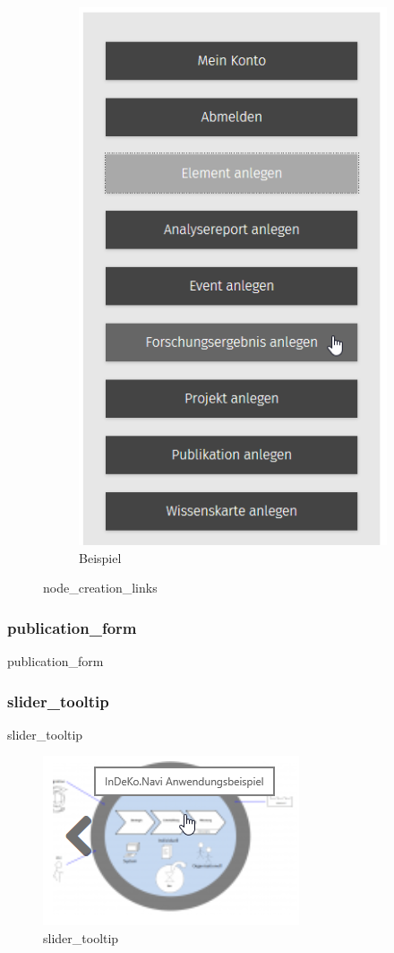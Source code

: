 \begin{figure}[H]
\begin{subfigure}[A]{0.4\textwidth}
		\includegraphics[height=0.20\textheight]{images/example_nodecreationlinks}
		\caption[]{Beispiel}
		\label{fig:example_nodecreationlinks}
	\end{subfigure}
	\caption[]{node\_creation\_links}
	\label{fig:nodecreationlinks}
\end{figure}



\subsubsection{publication\_form}\label{subsub:publicationform}
publication\_form


\subsubsection{slider\_tooltip}\label{subsub:slidertooltip}
slider\_tooltip
\begin{figure}[H]
	\centering
	\includegraphics[height=0.10\textheight]{images/example_slidertooltip}
	\caption[]{slider\_tooltip}
	\label{fig:example_slidertooltip}
\end{figure}



